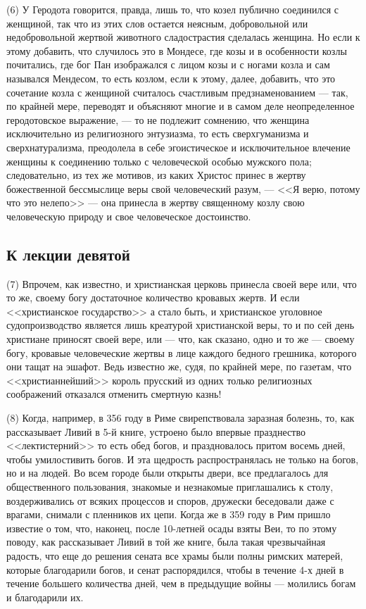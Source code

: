 \documentclass[12pt]{article}
\begin{document}
(6) У Геродота говорится, правда, лишь то, что козел публично соединился с женщиной, так что из этих слов остается неясным, добровольной или недобровольной жертвой животного сладострастия сделалась женщина. Но если к этому добавить, что случилось это в Мондесе, где козы и в особенности козлы почитались, где бог Пан изображался с лицом козы и с ногами козла и сам назывался Мендесом, то есть козлом, если к этому, далее, добавить, что это сочетание козла с женщиной считалось счастливым предзнаменованием --- так, по крайней мере, переводят и объясняют многие и в самом деле неопределенное геродотовское выражение, --- то не подлежит сомнению, что женщина исключительно из религиозного энтузиазма, то есть сверхгуманизма и сверхнатурализма, преодолела в себе эгоистическое и исключительное влечение женщины к соединению только с человеческой особью мужского пола; следовательно, из тех же мотивов, из каких Христос принес в жертву божественной бессмыслице веры свой человеческий разум, --- <<Я верю, потому что это нелепо>>  --- она принесла в жертву священному козлу свою человеческую природу и свое человеческое достоинство. 

\subsection*{К лекции девятой}

(7) Впрочем, как известно, и христианская церковь принесла своей вере или, что то же, своему богу достаточное количество кровавых жертв. И если <<христианское государство>>  а стало быть, и христианское уголовное судопроизводство является лишь креатурой христианской веры, то и по сей день христиане приносят своей вере, или --- что, как сказано, одно и то же --- своему богу, кровавые человеческие жертвы в лице каждого бедного грешника, которого они тащат на эшафот. Ведь известно же, судя, по крайней мере, по газетам, что <<христианнейший>> король прусский из одних только религиозных соображений отказался отменить смертную казнь! 

(8) Когда, например, в 356 году в Риме свирепствовала заразная болезнь, то, как рассказывает Ливий в 5-й книге, устроено было впервые празднество <<лектистерний>>  то есть обед богов, и праздновалось притом восемь дней, чтобы умилостивить богов. И эта щедрость распространялась не только на богов, но и на людей. Во всем городе были открыты двери, все предлагалось для общественного пользования, знакомые и незнакомые приглашались к столу, воздерживались от всяких процессов и споров, дружески беседовали даже с врагами, снимали с пленников их цепи. Когда же в 359 году в Рим пришло известие о том, что, наконец, после 10-летней осады взяты Веи, то по этому поводу, как рассказывает Ливий в той же книге, была такая чрезвычайная радость, что еще до решения сената все храмы были полны римских матерей, которые благодарили богов, и сенат распорядился, чтобы в течение 4-х дней в течение большего количества дней, чем в предыдущие войны --- молились богам и благодарили их. 
\end{document}
